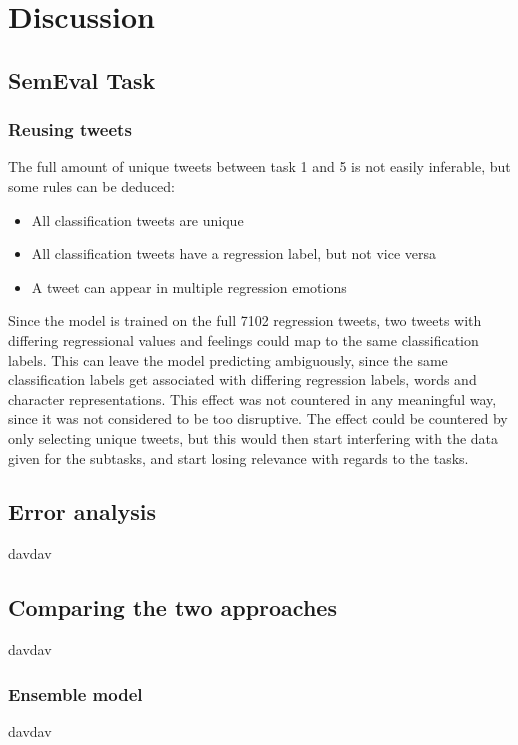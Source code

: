 
\section{Discussion}

\subsection{SemEval Task}
\subsubsection{Reusing tweets}
The full amount of unique tweets between task 1 and 5 is not easily inferable, but some rules can be deduced:\\
\begin{itemize}
\item All classification tweets are unique
\item All classification tweets have a regression label, but not vice versa
\item A tweet can appear in multiple regression emotions
\end{itemize}
Since the model is trained on the full 7102 regression tweets, two tweets with differing regressional values and feelings could map to the same classification labels. This can leave the model predicting ambiguously, since the same classification labels get associated with differing regression labels, words and character representations. This effect was not countered in any meaningful way, since it was not considered to be too disruptive. The effect could be countered by only selecting unique tweets, but this would then start interfering with the data given for the subtasks, and start losing relevance with regards to the tasks. 

\subsection{Error analysis}
davdav

\subsection{Comparing the two approaches}
davdav

\subsubsection{Ensemble model}
davdav

